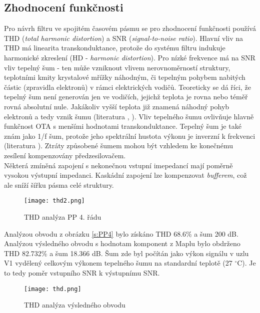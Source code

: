 \subsection{Zhodnocení funkčnosti}
\noindent Pro návrh filtru ve spojitém časovém  pásmu se pro zhodnocení funkčnosti používá THD (\textit{total harmonic distortion}) a SNR (\textit{signal-to-noise ratio}). Hlavní vliv na THD má linearita transkonduktance, protože do systému filtru indukuje harmonické zkreslení (HD - \textit{harmonic distortion}). Pro nízké frekvence má na SNR vliv tepelný šum - ten může vzniknout vlivem nerovnoměrností struktury, teplotními kmity krystalové mřížky náhodným, či tepelným pohybem nabitých částic (zpravidla elektronů) v rámci elektrických vodičů. Teoreticky se dá říci, že tepelný šum není generován jen ve vodičích, jejichž teplota je rovna nebo téměř rovná absolutní nule. Jakákoliv vyšší teplota již znamená náhodný pohyb elektronů a tedy vznik šumu (literatura \cite{20}, \cite{21}). Vliv tepelného šumu ovlivňuje hlavně funkčnost OTA s menšími hodnotami transkonduktance. Tepelný šum je také znám jako 1/f šum, protože jeho spektrální hustota výkonu je inverzní k frekvenci (literatura \cite{2}). Ztráty způsobené šumem mohou být vzhledem ke konečnému zesílení kompenzovány předzesilovačem. \\
Některá zmíněná zapojení s nekonečnou vstupní imepedancí mají poměrně vysokou výstupní impedanci. Kaskádní zapojení lze kompenzovat  \textit{bufferem}, což ale sníží šířku pásma celé struktury.
\begin{figure}[h]
\centering
\texttt{[image: thd2.png]}
\caption[THD analýza PP 4. řádu]{THD analýza PP 4. řádu}
\end{figure}
Analýzou obvodu z obrázku \ref{s:PP4} bylo získáno THD 68.6\% a šum 200 dB. Analýzou výsledného obvodu s hodnotam komponent z Maplu bylo obdrženo THD 82.732\% a šum 18.366 dB. Šum zde byl počítán jako výkon signálu v uzlu V1 vydělený celkovým výkonem tepelného šumu na standardní teplotě (27 $^{\circ}$C). Je to tedy poměr vstupního SNR k výstupnímu SNR.
\begin{figure}[h]
\centering
\texttt{[image: thd.png]}
\caption[THD analýza výsledného obvodu]{THD analýza výsledného obvodu}
\end{figure}